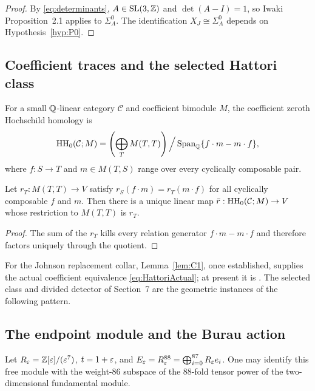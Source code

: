 \begin{proof}
By \eqref{eq:determinants}, $A\in\mathrm{SL}(3,\mathbb{Z})$ and $\det(A-I)=1$, so
Iwaki Proposition~2.1 \cite{Iwaki2024} applies to $\Sigma_A^0$.  The
identification $X_J\cong\Sigma_A^0$ depends on Hypothesis~\ref{hyp:P0}.
\end{proof}

\subsection{Coefficient traces and the selected Hattori class}

\begin{definition}\label{def:coefficient-HH0}
For a small $\mathbb{Q}$-linear category $\mathcal C$ and coefficient bimodule $M$,
the coefficient zeroth Hochschild homology is
\[
\operatorname{HH}_{0}(\mathcal C;M)=
\left(\bigoplus_{T}M(T,T)\right)
\Big/
\operatorname{Span}_{\mathbb{Q}}\{f\cdot m-m\cdot f\},
\]
where $f:S\to T$ and $m\in M(T,S)$ range over every cyclically composable
pair.
\end{definition}

\begin{lemma}\label{lem:HH0-descent}
Let $r_T:M(T,T)\to V$ satisfy $r_S(f\cdot m)=r_T(m\cdot f)$ for all
cyclically composable $f$ and $m$.  Then there is a unique linear map
$\bar r:\operatorname{HH}_{0}(\mathcal C;M)\to V$ whose restriction to $M(T,T)$ is $r_T$.
\end{lemma}

\begin{proof}
The sum of the $r_T$ kills every relation generator $f\cdot m-m\cdot f$ and
therefore factors uniquely through the quotient.
\end{proof}

For the Johnson replacement collar, Lemma~\ref{lem:C1}, once established,
supplies the actual coefficient equivalence \eqref{eq:HattoriActual}; at
present it is \Open.  The selected class and
divided detector of Section~7 are the geometric instances of the following
pattern.

\subsection{The endpoint module and the Burau action}

\begin{definition}\label{def:endpoint-module}
Let $R_\varepsilon=\mathbb{Z}[\varepsilon]/(\varepsilon^7)$, $t=1+\varepsilon$, and
$E_\varepsilon=R_\varepsilon^{88}=\bigoplus_{i=0}^{87}R_\varepsilon e_i$.  One may identify this
free module with the weight-$86$ subspace of the $88$-fold tensor power of
the two-dimensional fundamental module.
\end{definition}


